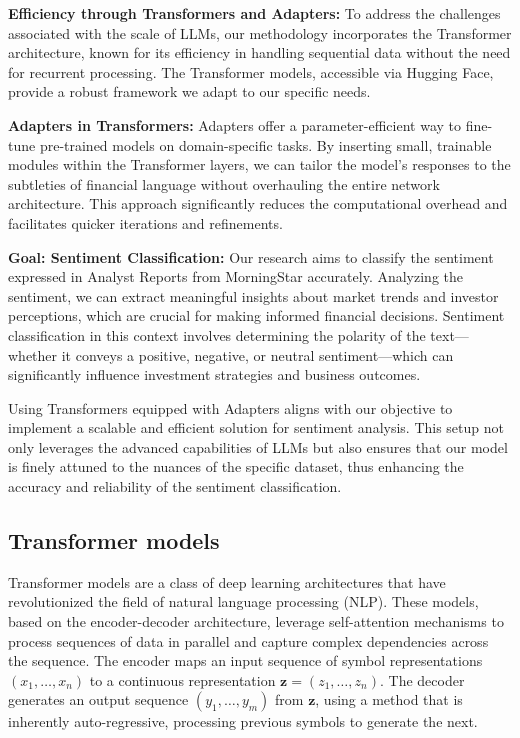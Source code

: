 \documentclass[conference]{IEEEtran}
\begin{document}
\textbf{Efficiency through Transformers and Adapters:} To address the challenges associated with the scale of LLMs, our methodology incorporates the Transformer architecture, known for its efficiency in handling sequential data without the need for recurrent processing. The Transformer models, accessible via Hugging Face, provide a robust framework we adapt to our specific needs.

\textbf{Adapters in Transformers:} Adapters offer a parameter-efficient way to fine-tune pre-trained models on domain-specific tasks. By inserting small, trainable modules within the Transformer layers, we can tailor the model's responses to the subtleties of financial language without overhauling the entire network architecture. This approach significantly reduces the computational overhead and facilitates quicker iterations and refinements.

\textbf{Goal: Sentiment Classification:} Our research aims to classify the sentiment expressed in Analyst Reports from MorningStar accurately. Analyzing the sentiment, we can extract meaningful insights about market trends and investor perceptions, which are crucial for making informed financial decisions. Sentiment classification in this context involves determining the polarity of the text—whether it conveys a positive, negative, or neutral sentiment—which can significantly influence investment strategies and business outcomes.

Using Transformers equipped with Adapters aligns with our objective to implement a scalable and efficient solution for sentiment analysis. This setup not only leverages the advanced capabilities of LLMs but also ensures that our model is finely attuned to the nuances of the specific dataset, thus enhancing the accuracy and reliability of the sentiment classification. \cite{Vaswani2023}

\subsection{Transformer models}%
Transformer models are a class of deep learning architectures that have revolutionized the field of natural language processing (NLP). These models, based on the encoder-decoder architecture, leverage self-attention mechanisms to process sequences of data in parallel and capture complex dependencies across the sequence. The encoder maps an input sequence of symbol representations $(x_1, \ldots, x_n)$ to a continuous representation $\mathbf{z}=(z_1, \ldots, z_n)$. The decoder generates an output sequence $(y_1, \ldots, y_m)$ from $\mathbf{z}$, using a method that is inherently auto-regressive, processing previous symbols to generate the next.
\end{document}
